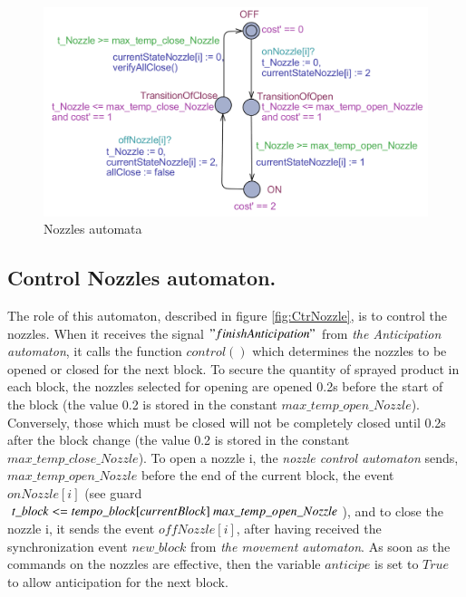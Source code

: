 \begin{figure}[ht!]
\begin{center}
\includegraphics[scale = 0.8, angle =90]{nozzle.png}
\caption{Nozzles automata} 
\label{fig:nozzle}
\end{center}
\end{figure}

\subsection{\textbf{Control Nozzles automaton.}} The role of this automaton, described in figure \ref{fig:CtrNozzle}, is to control the nozzles. When it receives the signal $ "finishAnticipation"$ from \textit{the Anticipation automaton}, it calls the function $control ()$ which determines the nozzles to be opened or closed for the next block. To secure the quantity of sprayed product in each block, the nozzles selected for opening are opened 0.2s before the start of the block (the value 0.2 is stored in the constant $ max\_temp\_open\_Nozzle $). Conversely, those which must be closed will not be completely closed until 0.2s after the block change (the value 0.2 is stored in the constant $ max\_temp\_close\_Nozzle $). To open a nozzle i, the \textit{nozzle control automaton} sends, 
$max\_temp\_open\_Nozzle $ before the end of the current block, the event $onNozzle [i]$  (see guard $t\_block <= tempo\_block[currentBlock]\-\ max\_temp\_open\_Nozzle $), and to close the nozzle i, it sends the event $offNozzle [i]$, after having received the synchronization event $new\_block$ from \textit{the movement automaton}. As soon as the commands on the nozzles are effective, then the variable $anticipe$ is set to $ True $ to allow anticipation for the next block.


